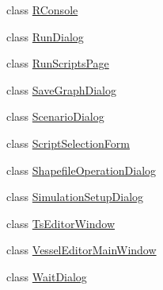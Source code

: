 \begin{DoxyCompactItemize}
\item 
class \mbox{\hyperlink{class_ui_1_1_r_console}{R\+Console}}
\item 
class \mbox{\hyperlink{class_ui_1_1_run_dialog}{Run\+Dialog}}
\item 
class \mbox{\hyperlink{class_ui_1_1_run_scripts_page}{Run\+Scripts\+Page}}
\item 
class \mbox{\hyperlink{class_ui_1_1_save_graph_dialog}{Save\+Graph\+Dialog}}
\item 
class \mbox{\hyperlink{class_ui_1_1_scenario_dialog}{Scenario\+Dialog}}
\item 
class \mbox{\hyperlink{class_ui_1_1_script_selection_form}{Script\+Selection\+Form}}
\item 
class \mbox{\hyperlink{class_ui_1_1_shapefile_operation_dialog}{Shapefile\+Operation\+Dialog}}
\item 
class \mbox{\hyperlink{class_ui_1_1_simulation_setup_dialog}{Simulation\+Setup\+Dialog}}
\item 
class \mbox{\hyperlink{class_ui_1_1_ts_editor_window}{Ts\+Editor\+Window}}
\item 
class \mbox{\hyperlink{class_ui_1_1_vessel_editor_main_window}{Vessel\+Editor\+Main\+Window}}
\item 
class \mbox{\hyperlink{class_ui_1_1_wait_dialog}{Wait\+Dialog}}
\end{DoxyCompactItemize}
